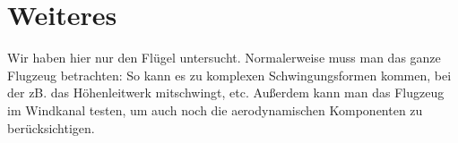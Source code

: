 \documentclass[12pt,a4paper,headinclude,bibtotoc]{scrartcl}
\begin{document}
\section{Weiteres}
Wir haben hier nur den Flügel untersucht.
Normalerweise muss man das ganze Flugzeug betrachten: So kann es zu komplexen Schwingungsformen kommen, bei der zB. das Höhenleitwerk mitschwingt, etc.
Außerdem kann man das Flugzeug im Windkanal testen, um auch noch die aerodynamischen Komponenten zu berücksichtigen.
\end{document}
